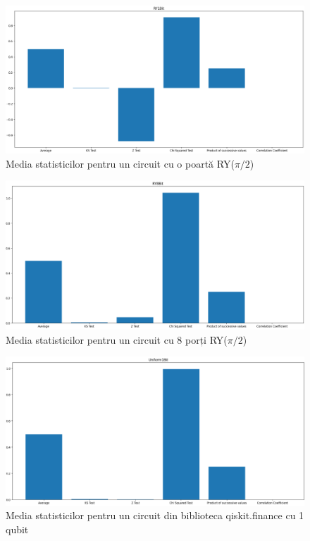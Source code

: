 \begin{figure}[H]
    \centering
    \includegraphics[width=1.0\textwidth]{continut/capitol4/figuri/StatsRY1Bit.png}
    \caption{Media statisticilor pentru un circuit cu o poartă RY($\pi/2$)}
    \label{fig:StatsBarRY1Bit}
\end{figure}

\begin{figure}[H]
    \centering
    \includegraphics[width=1.0\textwidth]{continut/capitol4/figuri/StatsRY8Bit.png}
    \caption{Media statisticilor pentru un circuit cu 8 porți RY($\pi/2$)}
    \label{fig:StatsBarRY8Bit}
\end{figure}

\begin{figure}[H]
    \centering
    \includegraphics[width=1.0\textwidth]{continut/capitol4/figuri/StatsUniform1Bit.png}
    \caption{Media statisticilor pentru un circuit din biblioteca qiskit.finance cu 1 qubit}
    \label{fig:StatsBarUniform1Bit}
\end{figure}

